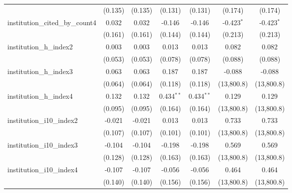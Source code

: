 \begin{tabular}{lcccccc}
                                         & (0.135)        & (0.135)        & (0.131)       & (0.131)       & (0.174)        & (0.174)\\   
   institution\_cited\_by\_count4        & 0.032          & 0.032          & -0.146        & -0.146        & -0.423$^{*}$   & -0.423$^{*}$\\   
                                         & (0.161)        & (0.161)        & (0.144)       & (0.144)       & (0.213)        & (0.213)\\   
   institution\_h\_index2                & 0.003          & 0.003          & 0.013         & 0.013         & 0.082          & 0.082\\   
                                         & (0.053)        & (0.053)        & (0.078)       & (0.078)       & (0.088)        & (0.088)\\   
   institution\_h\_index3                & 0.063          & 0.063          & 0.187         & 0.187         & -0.088         & -0.088\\   
                                         & (0.064)        & (0.064)        & (0.118)       & (0.118)       & (13,800.8)     & (13,800.8)\\   
   institution\_h\_index4                & 0.132          & 0.132          & 0.434$^{**}$  & 0.434$^{**}$  & 0.129          & 0.129\\   
                                         & (0.095)        & (0.095)        & (0.164)       & (0.164)       & (13,800.8)     & (13,800.8)\\   
   institution\_i10\_index2              & -0.021         & -0.021         & 0.013         & 0.013         & 0.733          & 0.733\\   
                                         & (0.107)        & (0.107)        & (0.101)       & (0.101)       & (13,800.8)     & (13,800.8)\\   
   institution\_i10\_index3              & -0.104         & -0.104         & -0.198        & -0.198        & 0.569          & 0.569\\   
                                         & (0.128)        & (0.128)        & (0.163)       & (0.163)       & (13,800.8)     & (13,800.8)\\   
   institution\_i10\_index4              & -0.107         & -0.107         & -0.056        & -0.056        & 0.464          & 0.464\\   
                                         & (0.140)        & (0.140)        & (0.156)       & (0.156)       & (13,800.8)     & (13,800.8)\\   

\end{tabular}
